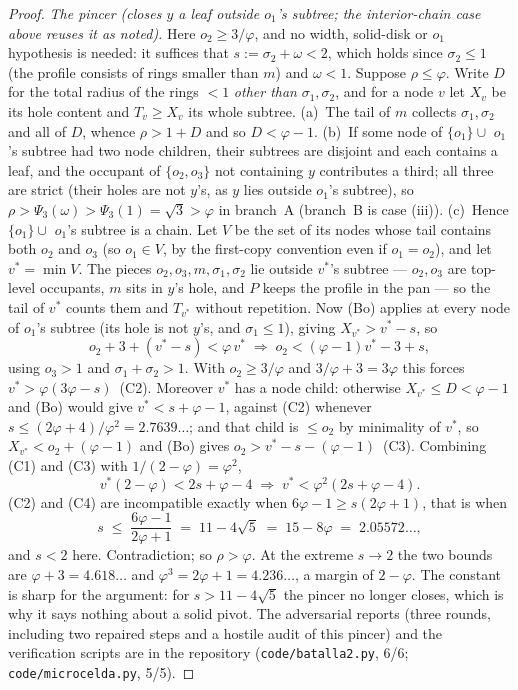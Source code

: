 \documentclass[10pt,a4paper]{amsart}
\begin{document}
\begin{proof}
\emph{The pincer (closes $y$ a leaf outside $o_1$'s subtree; the
interior-chain case above reuses it as noted).} Here
$o_2\ge3/\varphi$, and no width, solid-disk or $o_1$ hypothesis is
needed: it suffices that $s:=\sigma_2+\omega<2$, which holds since
$\sigma_2\le1$ (the profile consists of rings smaller than $m$) and
$\omega<1$. Suppose $\rho\le\varphi$. Write $D$ for the total radius of
the rings $<1$ \emph{other than} $\sigma_1,\sigma_2$, and for a node $v$
let $X_v$ be its hole content and $T_v\ge X_v$ its whole subtree.
(a)~The tail of $m$ collects $\sigma_1,\sigma_2$ and all of $D$, whence
$\rho>1+D$ and so $D<\varphi-1$. (b)~If some node of $\{o_1\}\cup$
$o_1$'s subtree had two node children, their subtrees are disjoint and
each contains a leaf, and the occupant of $\{o_2,o_3\}$ not containing
$y$ contributes a third; all three are strict (their holes are not
$y$'s, as $y$ lies outside $o_1$'s subtree), so
$\rho>\Psi_3(\omega)>\Psi_3(1)=\sqrt3>\varphi$ in branch~A
(branch~B is case (iii)). (c)~Hence $\{o_1\}\cup$ $o_1$'s subtree is a
chain. Let $V$ be the set of its nodes whose tail contains both $o_2$
and $o_3$ (so $o_1\in V$, by the first-copy convention even if
$o_1=o_2$), and let $v^{*}=\min V$. The pieces $o_2,o_3,m,\sigma_1,
\sigma_2$ lie outside $v^{*}$'s subtree --- $o_2,o_3$ are top-level
occupants, $m$ sits in $y$'s hole, and $P$ keeps the profile in the pan
--- so the tail of $v^{*}$ counts them and $T_{v^{*}}$ without
repetition. Now (Bo) applies at every node of $o_1$'s subtree (its hole
is not $y$'s, and $\sigma_1\le1$), giving $X_{v^{*}}>v^{*}-s$, so
\[
o_2+3+(v^{*}-s)<\varphi\,v^{*}
\;\Longrightarrow\;
o_2<(\varphi-1)v^{*}-3+s,
\tag{C1}
\]
using $o_3>1$ and $\sigma_1+\sigma_2>1$. With $o_2\ge3/\varphi$ and
$3/\varphi+3=3\varphi$ this forces $v^{*}>\varphi(3\varphi-s)$~(C2).
Moreover $v^{*}$ has a node child: otherwise $X_{v^{*}}\le D<\varphi-1$
and (Bo) would give $v^{*}<s+\varphi-1$, against (C2) whenever
$s\le(2\varphi+4)/\varphi^2=2.7639\dots$; and that child is $\le o_2$ by
minimality of $v^{*}$, so $X_{v^{*}}<o_2+(\varphi-1)$ and (Bo) gives
$o_2>v^{*}-s-(\varphi-1)$~(C3). Combining (C1) and (C3) with
$1/(2-\varphi)=\varphi^2$,
\[
v^{*}(2-\varphi)<2s+\varphi-4
\;\Longrightarrow\;
v^{*}<\varphi^{2}(2s+\varphi-4).
\tag{C4}
\]
(C2) and (C4) are incompatible exactly when
$6\varphi-1\ge s(2\varphi+1)$, that is when
\[
s\;\le\;\frac{6\varphi-1}{2\varphi+1}\;=\;11-4\sqrt5\;=\;15-8\varphi
\;=\;2.05572\dots,
\]
and $s<2$ here. Contradiction; so $\rho>\varphi$. At the extreme $s\to2$
the two bounds are $\varphi+3=4.618\dots$ and
$\varphi^3=2\varphi+1=4.236\dots$, a margin of $2-\varphi$. The
constant is sharp for the argument: for $s>11-4\sqrt5$ the pincer no
longer closes, which is why it says nothing about a solid pivot.
The adversarial reports (three rounds, including two repaired steps and
a hostile audit of this pincer) and the verification scripts are in the
repository (\texttt{code/batalla2.py}, 6/6;
\texttt{code/microcelda.py}, 5/5).
\end{proof}
\end{document}
